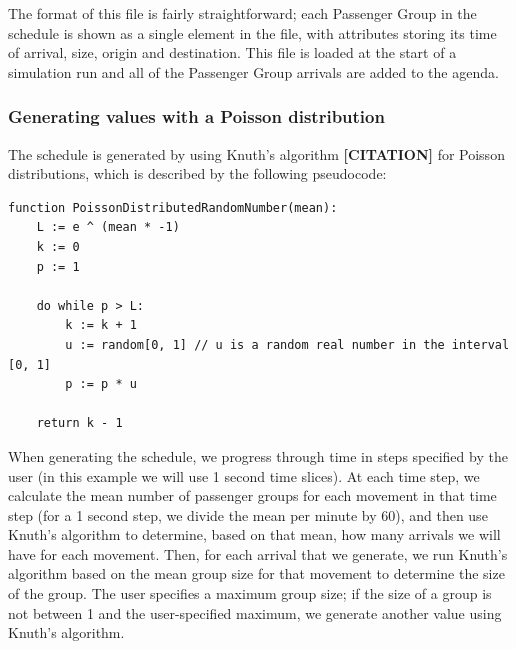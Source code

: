 \documentclass{UoYCSproject}
\begin{document}
The format of this file is fairly straightforward; each Passenger Group in the schedule is shown as a single element in the file, with attributes storing its time of arrival, size, origin and destination.  This file is loaded at the start of a simulation run and all of the Passenger Group arrivals are added to the agenda.

\subsubsection{Generating values with a Poisson distribution}

The schedule is generated by using Knuth's algorithm \textbf{[CITATION]} for Poisson distributions, which is described by the following pseudocode:

\begin{lstlisting}
function PoissonDistributedRandomNumber(mean):
	L := e ^ (mean * -1)
	k := 0
	p := 1

	do while p > L:
		k := k + 1
		u := random[0, 1] // u is a random real number in the interval [0, 1]
		p := p * u

	return k - 1
\end{lstlisting}

When generating the schedule, we progress through time in steps specified by the user (in this example we will use 1 second time slices).  At each time step, we calculate the mean number of passenger groups for each movement in that time step (for a 1 second step, we divide the mean per minute by 60), and then use Knuth's algorithm to determine, based on that mean, how many arrivals we will have for each movement.  Then, for each arrival that we generate, we run Knuth's algorithm based on the mean group size for that movement to determine the size of the group.  The user specifies a maximum group size; if the size of a group is not between 1 and the user-specified maximum, we generate another value using Knuth's algorithm.
\end{document}
